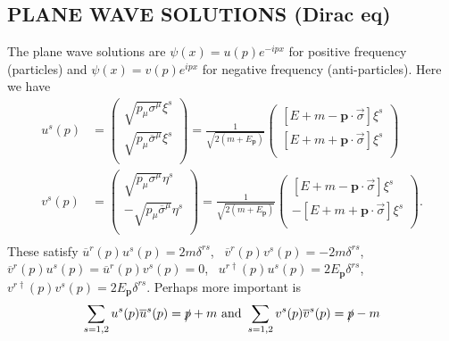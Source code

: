 \documentclass[a4paper, norsk, 8pt, landscape]{article}
\newcommand{\EQU}[1] { \begin{equation*} \begin{split}
#1
\end{split} \end{equation*} }
\begin{document}
\begin{multicols*}{3}
\subsection*{\footnotesize  PLANE WAVE SOLUTIONS (Dirac eq)}
The plane wave solutions are $\psi(x)=u(p)e^{-ipx}$ for positive frequency (particles) and
$\psi(x)=v(p)e^{ipx}$ for negative frequency (anti-particles). Here we have
\EQU{
u^s(p) &=
\left(\begin{matrix}
\sqrt{p_\mu \sigma^\mu }\xi^s \\
\sqrt{p_\mu \overline{\sigma}^\mu }\xi^s \\
\end{matrix}\right)
=
\frac{1}{\sqrt{2(m+E_\mathbf{p})}}
\left(\begin{matrix}
[E+m-\mathbf{p}\cdot \vec{\sigma}]\xi^s \\
[E+m+\mathbf{p}\cdot \vec{\sigma}]\xi^s \\
\end{matrix}\right) \\
v^s(p) &=
\left(\begin{matrix}
\sqrt{p_\mu \sigma^\mu }\eta^s \\
-\sqrt{p_\mu \overline{\sigma}^\mu }\eta^s \\
\end{matrix}\right)
=
\frac{1}{\sqrt{2(m+E_\mathbf{p})}}
\left(\begin{matrix}
[E+m-\mathbf{p}\cdot \vec{\sigma}]\xi^s \\
-[E+m+\mathbf{p}\cdot \vec{\sigma}]\xi^s \\
\end{matrix}\right). \\
}
These satisfy
$\overline{u}^r(p)u^s(p)=2m\delta^{rs}$, \
$\overline{v}^r(p)v^s(p)=-2m\delta^{rs}$, \
$\overline{v}^r(p)u^s(p)=\overline{u}^r(p)v^s(p)=0$, \
$u^{r\dagger}(p)u^s(p)=2E_\mathbf{p}\delta^{rs}$, \
$v^{r\dagger}(p)v^s(p)=2E_\mathbf{p}\delta^{rs}$.
Perhaps more important is
\[
\sum_{s=1,2} u^s(p) \overline{u}^s(p) = \slashed{p}+m
\text{ and }
\sum_{s=1,2} v^s(p) \overline{v}^s(p) = \slashed{p}-m
\]













\end{multicols*}
\end{document}
